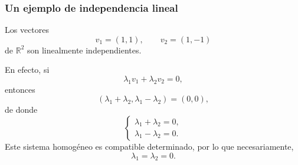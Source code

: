 \begin{frame}
    \frametitle{Un ejemplo de independencia lineal}

        Los vectores
        \[
            v_1=(1,1),
            \qquad
            v_2=(1,-1)
        \]
        de \(\mathbb{R}^2\) son linealmente independientes.

        En efecto, si
        \[
            \lambda_1v_1+\lambda_2v_2=0,
        \]
        entonces
        \[
            (\lambda_1+\lambda_2,\lambda_1-\lambda_2)=(0,0),
        \]
        de donde
        \[
        \begin{cases}
        	\lambda_1+\lambda_2=0,\\
            \lambda_1-\lambda_2=0.
        \end{cases}
        \]
		Este sistema homogéneo es compatible determinado, por lo que necesariamente,
        \[
            \lambda_1=\lambda_2=0.
        \]
\end{frame}

